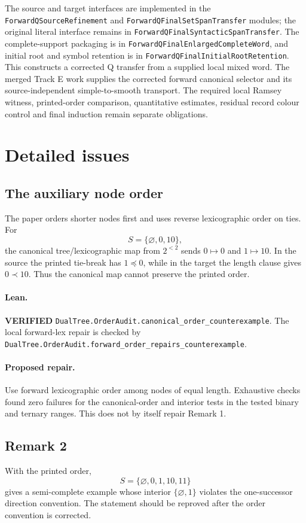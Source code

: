 \documentclass[11pt]{article}
\newcommand{\ok}{\textcolor{green!40!black}{\textbf{VERIFIED}}}
\newcommand{\lean}[1]{\texttt{#1}}
\begin{document}
The source and target interfaces are implemented in the
\texttt{ForwardQSourceRefinement} and
\texttt{ForwardQFinalSetSpanTransfer} modules; the original literal
interface remains in \texttt{ForwardQFinalSyntacticSpanTransfer}.
The complete-support
packaging is in \texttt{ForwardQFinalEnlargedCompleteWord}, and initial
root and symbol retention is in
\texttt{ForwardQFinalInitialRootRetention}.
This constructs a corrected Q transfer from a supplied local mixed word.
The merged Track E work supplies the corrected forward canonical selector
and its source-independent simple-to-smooth transport.  The required local
Ramsey witness, printed-order comparison, quantitative estimates, residual
record colour control and final induction remain separate obligations.

\section{Detailed issues}

\subsection{The auxiliary node order}
The paper orders shorter nodes first and uses reverse lexicographic order on
ties.  For
\[
S=\{\varnothing,0,10\},
\]
the canonical tree/lexicographic map from $2^{<2}$ sends
$0\mapsto0$ and $1\mapsto10$.  In the source the printed tie-break has
$1\preccurlyeq0$, while in the target the length clause gives
$0\prec10$.  Thus the canonical map cannot preserve the printed order.

\paragraph{Lean.} \ok
\lean{DualTree.OrderAudit.canonical_order_counterexample}.
The local forward-lex repair is checked by
\lean{DualTree.OrderAudit.forward_order_repairs_counterexample}.

\paragraph{Proposed repair.}
Use forward lexicographic order among nodes of equal length.  Exhaustive checks
found zero failures for the canonical-order and interior tests in the tested
binary and ternary ranges.  This does not by itself repair Remark 1.

\subsection{Remark 2}
With the printed order,
\[
S=\{\varnothing,0,1,10,11\}
\]
gives a semi-complete example whose interior
$\{\varnothing,1\}$ violates the one-successor direction convention.
The statement should be reproved after the order convention is corrected.
\end{document}
